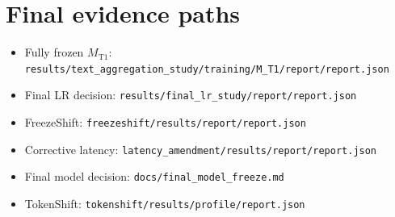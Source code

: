 \documentclass[11pt,a4paper,oneside]{report}
\newcommand{\MTone}{\ensuremath{M_{\mathrm{T1}}}}
\begin{document}
\chapter{Final evidence paths}
\begin{itemize}
\item Fully frozen \MTone{}: \texttt{results/\linebreak[1]text\_\linebreak[1]aggregation\_\linebreak[1]study/\linebreak[1]training/\linebreak[1]M\_\linebreak[1]T1/\linebreak[1]report/\linebreak[1]report.\linebreak[1]json}
\item Final LR decision: \texttt{results/\linebreak[1]final\_\linebreak[1]lr\_\linebreak[1]study/\linebreak[1]report/\linebreak[1]report.\linebreak[1]json}
\item FreezeShift: \texttt{freezeshift/\linebreak[1]results/\linebreak[1]report/\linebreak[1]report.\linebreak[1]json}
\item Corrective latency: \texttt{latency\_\linebreak[1]amendment/\linebreak[1]results/\linebreak[1]report/\linebreak[1]report.\linebreak[1]json}
\item Final model decision: \texttt{docs/\linebreak[1]final\_\linebreak[1]model\_\linebreak[1]freeze.\linebreak[1]md}
\item TokenShift: \texttt{tokenshift/\linebreak[1]results/\linebreak[1]profile/\linebreak[1]report.\linebreak[1]json}

\end{itemize}
\end{document}
